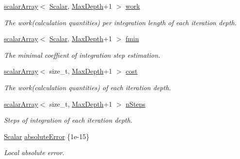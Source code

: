 \begin{DoxyCompactItemize}
\mbox{\hyperlink{class_b_s_iterator_ab0aa7c10b56500273af05dcd85fd8389}{scalar\+Array}}$<$ \mbox{\hyperlink{class_b_s_iterator_a7857f8ff9032955ea4dcc22cd18ca7a1}{Scalar}}, \mbox{\hyperlink{class_b_s_iterator_a39409b9a12d4854d101ce59a0efc0f74}{Max\+Depth}}+1 $>$ \mbox{\hyperlink{class_b_s_iterator_ac2a338d6c3e5014d529666032d34c987}{work}}
\begin{DoxyCompactList}\small\item\em The work(calculation quantities) per integration length of each iteration depth. \end{DoxyCompactList}\item 
\mbox{\hyperlink{class_b_s_iterator_ab0aa7c10b56500273af05dcd85fd8389}{scalar\+Array}}$<$ \mbox{\hyperlink{class_b_s_iterator_a7857f8ff9032955ea4dcc22cd18ca7a1}{Scalar}}, \mbox{\hyperlink{class_b_s_iterator_a39409b9a12d4854d101ce59a0efc0f74}{Max\+Depth}}+1 $>$ \mbox{\hyperlink{class_b_s_iterator_a05bf5c727d23e47349683cda1a08ed13}{fmin}}
\begin{DoxyCompactList}\small\item\em The minimal coeffient of integration step estimation. \end{DoxyCompactList}\item 
\mbox{\hyperlink{class_b_s_iterator_ab0aa7c10b56500273af05dcd85fd8389}{scalar\+Array}}$<$ size\+\_\+t, \mbox{\hyperlink{class_b_s_iterator_a39409b9a12d4854d101ce59a0efc0f74}{Max\+Depth}}+1 $>$ \mbox{\hyperlink{class_b_s_iterator_a53f435811c23c0ae1713df13197fc9c9}{cost}}
\begin{DoxyCompactList}\small\item\em The work(calculation quantities) of each iteration depth. \end{DoxyCompactList}\item 
\mbox{\hyperlink{class_b_s_iterator_ab0aa7c10b56500273af05dcd85fd8389}{scalar\+Array}}$<$ size\+\_\+t, \mbox{\hyperlink{class_b_s_iterator_a39409b9a12d4854d101ce59a0efc0f74}{Max\+Depth}}+1 $>$ \mbox{\hyperlink{class_b_s_iterator_a9c4c8c17a759cdff694e0bd62ed249bd}{n\+Steps}}
\begin{DoxyCompactList}\small\item\em Steps of integration of each iteration depth. \end{DoxyCompactList}\item 
\mbox{\hyperlink{class_b_s_iterator_a7857f8ff9032955ea4dcc22cd18ca7a1}{Scalar}} \mbox{\hyperlink{class_b_s_iterator_a8948aa04b0ec390d43eb3d1f0a2efb03}{absolute\+Error}} \{1e-\/15\}
\begin{DoxyCompactList}\small\item\em Local absolute error. \end{DoxyCompactList}\item 

\end{DoxyCompactItemize}
